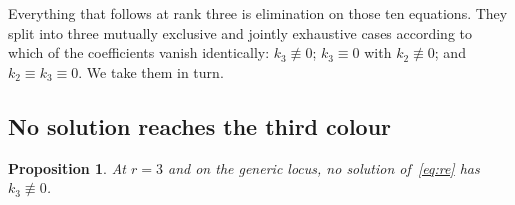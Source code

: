 \documentclass[
  aps,pre,
  reprint,
  superscriptaddress,
  amsmath,amssymb,
  floatfix
]{revtex4-2}
\theoremstyle{plain}
\newtheorem{proposition}[theorem]{Proposition}
\theoremstyle{definition}
\theoremstyle{remark}
\begin{document}
Everything that follows at rank three is elimination on those ten equations.
They split into three mutually exclusive and jointly exhaustive cases according
to which of the coefficients vanish identically: $k_3\not\equiv0$; $k_3\equiv0$
with $k_2\not\equiv0$; and $k_2\equiv k_3\equiv0$. We take them in turn.

\subsection{No solution reaches the third colour}
\label{sec:k3}

\begin{proposition}
\label{prop:k3}
At $r=3$ and on the generic locus, no solution of~\eqref{eq:re} has
$k_3\not\equiv0$.
\end{proposition}
\end{document}
